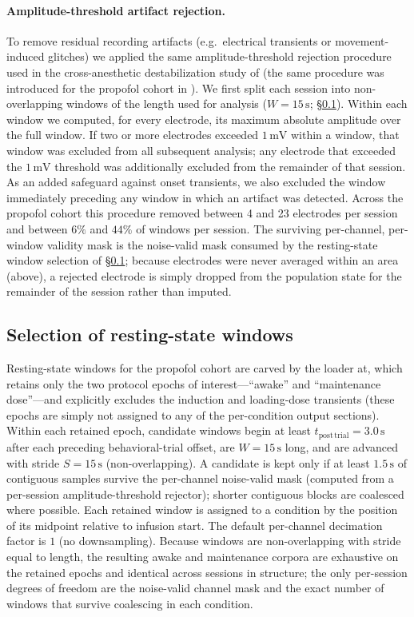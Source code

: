 \paragraph{Amplitude-threshold artifact rejection.} To remove residual recording artifacts (e.g.\ electrical transients or movement-induced glitches) we applied the same amplitude-threshold rejection procedure used in the cross-anesthetic destabilization study of \textcite{Eisen2026-cw} (the same procedure was introduced for the propofol cohort in \cite{Eisen2024-vc}). We first split each session into non-overlapping windows of the length used for analysis ($W=15\,\mathrm{s}$; \S\ref{supp:interareal-control-rest-windows}). Within each window we computed, for every electrode, its maximum absolute amplitude over the full window. If two or more electrodes exceeded $1\,\mathrm{mV}$ within a window, that window was excluded from all subsequent analysis; any electrode that exceeded the $1\,\mathrm{mV}$ threshold was additionally excluded from the remainder of that session. As an added safeguard against onset transients, we also excluded the window immediately preceding any window in which an artifact was detected. Across the propofol cohort this procedure removed between 4 and 23 electrodes per session and between $6\%$ and $44\%$ of windows per session. The surviving per-channel, per-window validity mask is the noise-valid mask consumed by the resting-state window selection of \S\ref{supp:interareal-control-rest-windows}; because electrodes were never averaged within an area (above), a rejected electrode is simply dropped from the population state for the remainder of the session rather than imputed.

\subsection{Selection of resting-state windows}\label{supp:interareal-control-rest-windows}

Resting-state windows for the propofol cohort are carved by the loader at, which retains only the two protocol epochs of interest---``awake'' and ``maintenance dose''---and explicitly excludes the induction and loading-dose transients (these epochs are simply not assigned to any of the per-condition output sections). Within each retained epoch, candidate windows begin at least $t_{\mathrm{post\,trial}}=3.0\,\mathrm{s}$ after each preceding behavioral-trial offset, are $W=15\,\mathrm{s}$ long, and are advanced with stride $S=15\,\mathrm{s}$ (non-overlapping). A candidate is kept only if at least $1.5\,\mathrm{s}$ of contiguous samples survive the per-channel noise-valid mask (computed from a per-session amplitude-threshold rejector); shorter contiguous blocks are coalesced where possible. Each retained window is assigned to a condition by the position of its midpoint relative to infusion start. The default per-channel decimation factor is $1$ (no downsampling). Because windows are non-overlapping with stride equal to length, the resulting awake and maintenance corpora are exhaustive on the retained epochs and identical across sessions in structure; the only per-session degrees of freedom are the noise-valid channel mask and the exact number of windows that survive coalescing in each condition.

